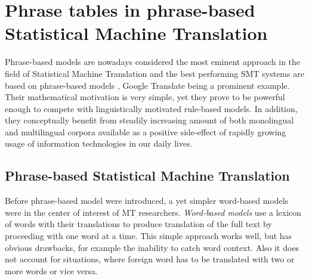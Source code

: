 
\chapter{Phrase tables in phrase-based Statistical Machine Translation}
\label{chap:phrase-based}


Phrase-based models are nowadays considered the most eminent approach in
the field of Statistical Machine Translation and the best performing
SMT systems are based on phrase-based models \citep{koehn:smt},
Google Translate being a prominent example.
Their mathematical motivation is very simple, yet they prove to be powerful enough
to compete with linguistically motivated rule-based models.
In addition, they conceptually benefit from steadily increasing amount of both
monolingual and multilingual corpora available as a positive side-effect of rapidly
growing usage of information technologies in our daily lives.

\section{Phrase-based Statistical Machine Translation}

Before phrase-based model were introduced, a yet simpler word-based models were in
the center of interest of MT researchers. \emph{Word-based models} use a lexicon
of words with their translations to produce translation of the full text by proceeding
with one word at a time.
This simple approach works well, but has obvious drawbacks,
for example the inability to catch word context.
Also it does not account for situations, where foreign word has to be translated
with two or more words or vice versa.


